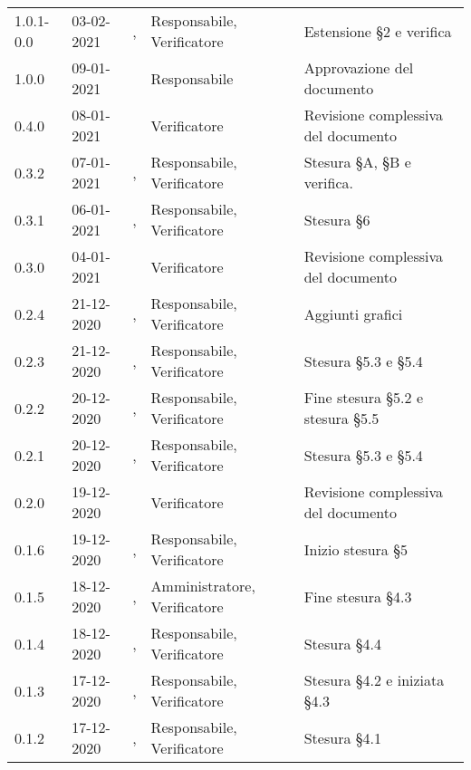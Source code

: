{{\begin{longtable}{C{1.7cm} C{2.5cm} C{3.2cm} C{2.7cm} C{4.8cm}}
1.0.1-0.0 & 03-02-2021 & \PA{}, \SP{} & Responsabile, Verificatore & Estensione \S 2 e verifica\\

1.0.0 & 09-01-2021 & \SG{} & Responsabile & Approvazione del documento \\

0.4.0 & 08-01-2021 & \ZM{} & Verificatore & Revisione complessiva del documento \\

0.3.2 & 07-01-2021 & \BM{}, \ZM{} & Responsabile, Verificatore & Stesura \S A, \S B e verifica. \\

0.3.1 & 06-01-2021 & \BM{}, \SH{} & Responsabile, Verificatore & Stesura \S 6\\

0.3.0 & 04-01-2021 & \SH{} & Verificatore & Revisione complessiva del documento \\

0.2.4 & 21-12-2020 & \SG{}, \SH{} & Responsabile, Verificatore & Aggiunti grafici \\

0.2.3 & 21-12-2020 & \BM{}, \ZM{} & Responsabile, Verificatore & Stesura \S 5.3 e \S 5.4\\

0.2.2 & 20-12-2020 & \SG{}, \ZM{} & Responsabile, Verificatore & Fine stesura \S 5.2 e stesura \S 5.5 \\

0.2.1 & 20-12-2020 & \BM{}, \ZM{} & Responsabile, Verificatore & Stesura \S 5.3 e \S 5.4\\

0.2.0 & 19-12-2020 & \ZM{} & Verificatore & Revisione complessiva del documento \\

0.1.6 & 19-12-2020 & \SG{}, \SH{} & Responsabile, Verificatore & Inizio stesura \S 5 \\

0.1.5 & 18-12-2020 & \PA{}, \SH{} & Amministratore, Verificatore & Fine stesura \S 4.3\\

0.1.4 & 18-12-2020 & \SG{}, \ZM{} & Responsabile, Verificatore & Stesura \S 4.4 \\

0.1.3 & 17-12-2020 & \BM{}, \ZM{} & Responsabile, Verificatore & Stesura \S 4.2 e iniziata \S 4.3 \\

0.1.2 & 17-12-2020 & \SG{}, \ZM{} & Responsabile, Verificatore & Stesura \S 4.1 \\


\end{longtable}}}
